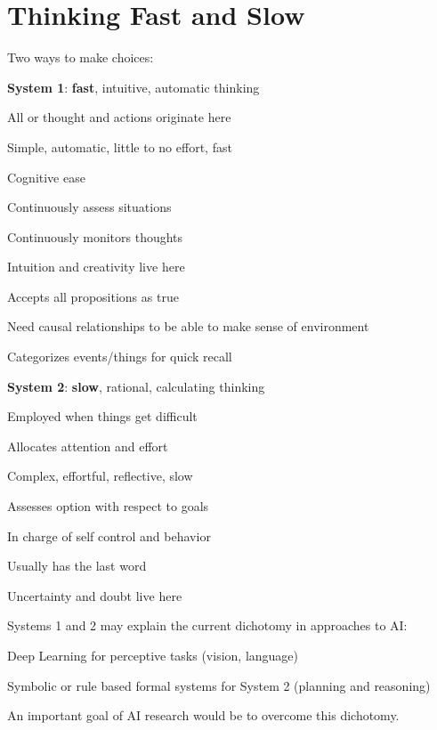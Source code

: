 \documentclass[10pt]{report}
\begin{document}
\section{Thinking Fast and Slow}
Two ways to make choices:
\begin{list}{}{}
	\item \textbf{System 1}: \textbf{fast}, intuitive, automatic thinking
	\begin{list}{}{}
		\item All or thought and actions originate here
		\item Simple, automatic, little to no effort, fast
		\item Cognitive ease
		\item Continuously assess situations
		\item Continuously monitors thoughts
		\item Intuition and creativity live here
		\item Accepts all propositions as true
		\item Need causal relationships to be able to make sense of environment
		\item Categorizes events/things for quick recall
	\end{list}
	\item \textbf{System 2}: \textbf{slow}, rational, calculating thinking
	\begin{list}{}{}
		\item Employed when things get difficult
		\item Allocates attention and effort
		\item Complex, effortful, reflective, slow
		\item Assesses option with respect to goals
		\item In charge of self control and behavior
		\item Usually has the last word
		\item Uncertainty and doubt live here
	\end{list}
\end{list}
Systems 1 and 2 may explain the current dichotomy in approaches to AI:
\begin{list}{}{}
	\item Deep Learning for perceptive tasks (vision, language)
	\item Symbolic or rule based formal systems for System 2 (planning and reasoning)
\end{list}
An important goal of AI research would be to overcome this dichotomy.
\end{document}
